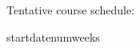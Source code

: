 \documentclass{article}
\begin{document}
Tentative course schedule:
\begin{center}
  \setlength{\calboxdepth}{1cm}
  \begin{calendar}{startdate}{numweeks}



  \end{calendar}
\end{center}
\end{document}
